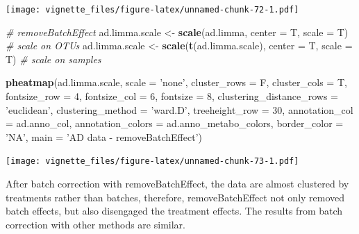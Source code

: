 \documentclass[]{book}
\newenvironment{Shaded}{\begin{snugshade}}{\end{snugshade}}
\newcommand{\KeywordTok}[1]{\textcolor[rgb]{0.13,0.29,0.53}{\textbf{#1}}}
\newcommand{\DataTypeTok}[1]{\textcolor[rgb]{0.13,0.29,0.53}{#1}}
\newcommand{\DecValTok}[1]{\textcolor[rgb]{0.00,0.00,0.81}{#1}}
\newcommand{\StringTok}[1]{\textcolor[rgb]{0.31,0.60,0.02}{#1}}
\newcommand{\CommentTok}[1]{\textcolor[rgb]{0.56,0.35,0.01}{\textit{#1}}}
\newcommand{\NormalTok}[1]{#1}
\begin{document}
\texttt{[image: vignette\_files/figure-latex/unnamed-chunk-72-1.pdf]}

\begin{Shaded}
\begin{Highlighting}[]
\CommentTok{# removeBatchEffect}
\NormalTok{ad.limma.scale <-}\StringTok{ }\KeywordTok{scale}\NormalTok{(ad.limma, }\DataTypeTok{center =}\NormalTok{ T, }\DataTypeTok{scale =}\NormalTok{ T) }\CommentTok{# scale on OTUs}
\NormalTok{ad.limma.scale <-}\StringTok{ }\KeywordTok{scale}\NormalTok{(}\KeywordTok{t}\NormalTok{(ad.limma.scale), }\DataTypeTok{center =}\NormalTok{ T, }\DataTypeTok{scale =}\NormalTok{ T) }\CommentTok{# scale on samples}

\KeywordTok{pheatmap}\NormalTok{(ad.limma.scale, }
         \DataTypeTok{scale =} \StringTok{'none'}\NormalTok{, }
         \DataTypeTok{cluster_rows =}\NormalTok{ F, }
         \DataTypeTok{cluster_cols =}\NormalTok{ T, }
         \DataTypeTok{fontsize_row =} \DecValTok{4}\NormalTok{, }\DataTypeTok{fontsize_col =} \DecValTok{6}\NormalTok{,}
         \DataTypeTok{fontsize =} \DecValTok{8}\NormalTok{,}
         \DataTypeTok{clustering_distance_rows =} \StringTok{'euclidean'}\NormalTok{,}
         \DataTypeTok{clustering_method =} \StringTok{'ward.D'}\NormalTok{,}
         \DataTypeTok{treeheight_row =} \DecValTok{30}\NormalTok{,}
         \DataTypeTok{annotation_col =}\NormalTok{ ad.anno_col,}
         \DataTypeTok{annotation_colors =}\NormalTok{ ad.anno_metabo_colors,}
         \DataTypeTok{border_color =} \StringTok{'NA'}\NormalTok{,}
         \DataTypeTok{main =} \StringTok{'AD data - removeBatchEffect'}\NormalTok{)}
\end{Highlighting}
\end{Shaded}

\texttt{[image: vignette\_files/figure-latex/unnamed-chunk-73-1.pdf]}

After batch correction with removeBatchEffect, the data are almost
clustered by treatments rather than batches, therefore,
removeBatchEffect not only removed batch effects, but also disengaged
the treatment effects. The results from batch correction with other
methods are similar.
\end{document}
